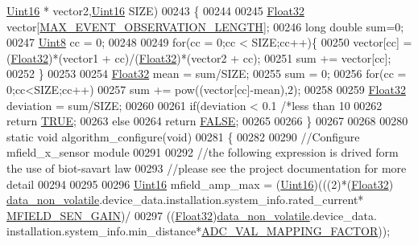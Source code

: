 \begin{DoxyCode}
      \hyperlink{a00072_a59a9f6be4562c327cbfb4f7e8e18f08b}{Uint16} * vector2,\hyperlink{a00072_a59a9f6be4562c327cbfb4f7e8e18f08b}{Uint16} SIZE)
00243 \{
00244 
00245     \hyperlink{a00072_a87d38f886e617ced2698fc55afa07637}{Float32} vector[\hyperlink{a00022_aa060aeb1ecb530b3c6f6d91060999b70}{MAX\_EVENT\_OBSERVATION\_LENGTH}];
00246     \textcolor{keywordtype}{long} \textcolor{keywordtype}{double} sum=0;
00247     \hyperlink{a00072_af84840501dec18061d18a68c162a8fa2}{Uint8} cc = 0;
00248   
00249     \textcolor{keywordflow}{for}(cc = 0;cc < SIZE;cc++)\{
00250         vector[cc] = (\hyperlink{a00072_a87d38f886e617ced2698fc55afa07637}{Float32})*(vector1 + cc)/(\hyperlink{a00072_a87d38f886e617ced2698fc55afa07637}{Float32})*(vector2 + cc);
00251         sum += vector[cc];
00252     \}
00253 
00254     \hyperlink{a00072_a87d38f886e617ced2698fc55afa07637}{Float32} mean =  sum/SIZE;
00255     sum = 0;
00256     \textcolor{keywordflow}{for}(cc = 0;cc<SIZE;cc++)
00257         sum += pow((vector[cc]-mean),2);
00258 
00259     \hyperlink{a00072_a87d38f886e617ced2698fc55afa07637}{Float32} deviation =  sum/SIZE;
00260 
00261     \textcolor{keywordflow}{if}(deviation < 0.1 \textcolor{comment}{/*less than 10%
00262         \textcolor{keywordflow}{return} \hyperlink{a00040_aa8cecfc5c5c054d2875c03e77b7be15d}{TRUE};
00263     \textcolor{keywordflow}{else}
00264         \textcolor{keywordflow}{return} \hyperlink{a00040_aa93f0eb578d23995850d61f7d61c55c1}{FALSE};
00265 
00266 \}
00267 
00268 
00280 \textcolor{keyword}{static} \textcolor{keywordtype}{void} algorithm\_configure(\textcolor{keywordtype}{void})
00281 \{
00282 
00290     \textcolor{comment}{//Configure mfield\_x\_sensor module}
00291 
00292     \textcolor{comment}{//the following expression is drived form the use of biot-savart law}
00293     \textcolor{comment}{//please see the project documentation for more detail}
00294     
00295 
00296      \hyperlink{a00072_a59a9f6be4562c327cbfb4f7e8e18f08b}{Uint16} mfield\_amp\_max      = (\hyperlink{a00072_a59a9f6be4562c327cbfb4f7e8e18f08b}{Uint16})(((2)*(\hyperlink{a00072_a87d38f886e617ced2698fc55afa07637}{Float32})
      \hyperlink{a00060_a76ac5f917f5308dcd83de0d7c94559fb}{data\_non\_volatile}.device\_data.installation.system\_info.rated\_current*
      \hyperlink{a00019_a0dbceb8ab2804359733a52568f2fd349}{MFIELD\_SEN\_GAIN})/
00297                                    ((\hyperlink{a00072_a87d38f886e617ced2698fc55afa07637}{Float32})\hyperlink{a00060_a76ac5f917f5308dcd83de0d7c94559fb}{data\_non\_volatile}.device\_data.
      installation.system\_info.min\_distance*\hyperlink{a00058_ada92d3eeeec0cbeee41e76a52d145792}{ADC\_VAL\_MAPPING\_FACTOR}));
}
\end{DoxyCode}
